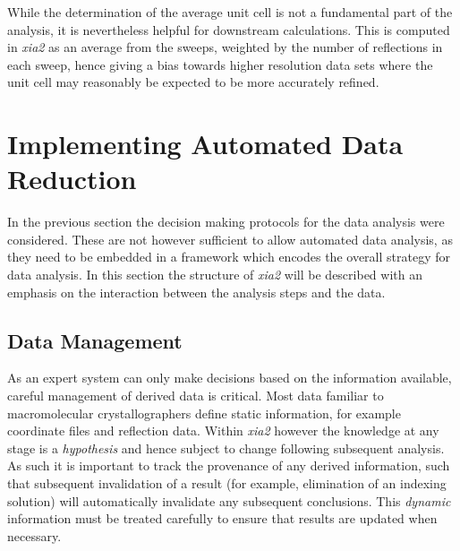 \documentclass[a4paper, 11pt]{article}
\begin{document}
While the determination of the average unit cell is not a fundamental
part of the analysis, it is nevertheless helpful for downstream
calculations. This is computed in \emph{xia2} as an average from the
sweeps, weighted by the number of reflections in each sweep, hence
giving a bias towards higher resolution data sets where the unit cell
may reasonably be expected to be more accurately refined.

\section{Implementing Automated Data Reduction}

In the previous section the decision making protocols for the data
analysis were considered. These are not however sufficient to allow
automated data analysis, as they need to be embedded in a framework
which encodes the overall strategy for data analysis. In this section
the structure of \emph{xia2} will be described with an emphasis on the
interaction between the analysis steps and the data.

\subsection{Data Management}

As an expert system can only make decisions based on the information
available, careful management of derived data is critical. Most data familiar
to macromolecular crystallographers define static
information, for example coordinate files and reflection data. 
Within \emph{xia2} however
the knowledge at any stage is a \emph{hypothesis} and hence
subject to change following subsequent analysis. As such it is
important to track the provenance of any derived information, such
that subsequent invalidation of a result (for example, elimination of
an indexing solution) will automatically invalidate any subsequent
conclusions. This \emph{dynamic} information must be treated carefully
to ensure that results are updated when necessary. 
\end{document}
